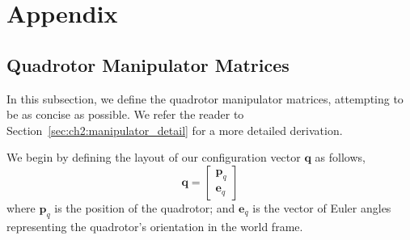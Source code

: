 \section{Appendix}

\subsection{Quadrotor Manipulator Matrices}
\label{sec:ch3:manipulator}

In this subsection, we define the quadrotor manipulator matrices, attempting to be as concise as possible.
We refer the reader to Section~\ref{sec:ch2:manipulator_detail} for a more detailed derivation.

We begin by defining the layout of our configuration vector $\mathbf{q}$ as follows,
%
\begin{equation}
\mathbf{q} = 
\begin{bmatrix}
\mathbf{p}_q \\
\mathbf{e}_q
\end{bmatrix}
\end{equation}
%
where
$\mathbf{p}_q$ is the position of the quadrotor;
and $\mathbf{e}_q$ is the vector of Euler angles representing the quadrotor's orientation in the world frame.

